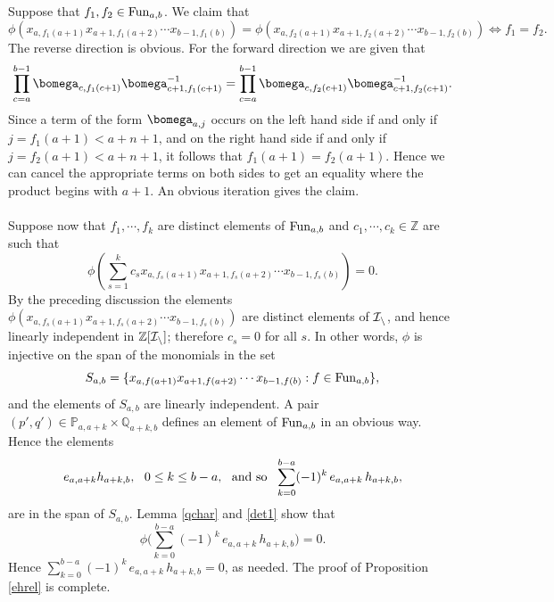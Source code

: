 \documentclass[11pt,reqno]{amsart}
\theoremstyle{definition} \newtheorem*{defn}{Definition}
\theoremstyle{definition}
\numberwithin{equation}{section}
\begin{document}
\subsubsection{} Suppose that $f_1, f_2\in{\rm Fun}_{a,b}$. We claim that $$\phi(x_{a,f_1(a+1)}x_{a+1,f_1(a+2)}\cdots x_{b-1,f_1(b)})=\phi(x_{a,f_2(a+1)}x_{a+1,f_2(a+2)}\cdots x_{b-1,f_2(b)})\iff f_1=f_2.$$
The reverse direction is obvious. For the forward direction we are given that
$$\prod_{c=a}^{b-1}\bomega_{c, f_1(c+1)}\bomega_{c+1,f_1(c+1)}^{-1}=\prod_{c=a}^{b-1}\bomega_{c, f_2(c+1)}\bomega_{c+1,f_2(c+1)}^{-1}.$$ Since a term of the form $\bomega_{a,j}$ occurs on the left hand side if and only if $j=f_1(a+1)<a+n+1$, and on the right hand side if and only if $j=f_2(a+1)<a+n+1$, it follows that $f_1(a+1)=f_2(a+1)$. Hence we can cancel the appropriate terms on both sides to get an equality where the product begins with $a+1$. An obvious iteration gives the claim.\\\\
Suppose now that $f_1,\cdots, f_k$ are distinct elements of ${\rm Fun}_{a,b}$ and $c_1,\cdots, c_k\in\mathbb Z$ are such that
$$\phi\left( \sum_{s=1}^kc_sx_{a,f_s(a+1)}x_{a+1,f_s(a+2)}\cdots x_{b-1,f_s(b)}\right)=0.$$
By the preceding discussion the elements $\phi(x_{a,f_s(a+1)}x_{a+1,f_s(a+2)}\cdots x_{b-1,f_s(b)})$ are distinct elements of $\cal I_n$, and hence linearly independent in $\mathbb Z[\cal I_n]$; therefore $c_s=0$ for all $s$. In other words, $\phi$ is injective on the span of the monomials in the set \begin{equation}\label{basis} S_{a,b}= \{x_{a,f(a+1)}x_{a+1,f(a+2)}\cdots x_{b-1,f(b)}: f\in{\rm Fun}_{a,b}\}, \end{equation} and the elements of $S_{a,b}$ are linearly independent.
A pair $(p',q')\in\mathbb P_{a,a+k}\times\mathbb Q_{a+k,b}$ defines an element of
${\rm Fun}_{a,b}$ in an obvious way. Hence the elements $$e_{a,a+k}h_{a+k,b},\ \ 0\le k\le b-a,\ \ {\rm and\ so}\ \  \sum_{k=0}^{b-a}(-1)^k\,e_{a,a+k}\,h_{a+k,b},$$ are in the span of $S_{a,b}$. Lemma \ref{qchar} and \eqref{det1} show that
$$\phi\Big(\sum_{k=0}^{b-a}(-1)^k\,e_{a,a+k}\,h_{a+k,b}\Big)=0.$$
Hence $\sum_{k=0}^{b-a}(-1)^k\,e_{a,a+k}\,h_{a+k,b}=0$, as needed. The proof of Proposition \ref{ehrel} is complete.
\end{document}

